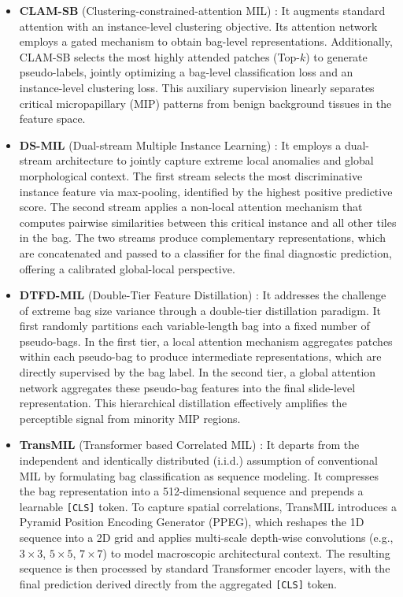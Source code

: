 \documentclass[journal]{IEEEtran}
\theoremstyle{remark}
\providecommand{\citep}[1]{\cite{#1}}
\begin{document}
\begin{itemize}
    \item \textbf{CLAM-SB} (Clustering-constrained-attention MIL) \citep{lu2021data}: It augments standard attention with an instance-level clustering objective. Its attention network employs a gated mechanism to obtain bag-level representations. Additionally, CLAM-SB selects the most highly attended patches (Top-$k$) to generate pseudo-labels, jointly optimizing a bag-level classification loss and an instance-level clustering loss. This auxiliary supervision linearly separates critical micropapillary (MIP) patterns from benign background tissues in the feature space.
    
    \item \textbf{DS-MIL} (Dual-stream Multiple Instance Learning) \citep{li2021dual}: It employs a dual-stream architecture to jointly capture extreme local anomalies and global morphological context. The first stream selects the most discriminative instance feature via max-pooling, identified by the highest positive predictive score. The second stream applies a non-local attention mechanism that computes pairwise similarities between this critical instance and all other tiles in the bag. The two streams produce complementary representations, which are concatenated and passed to a classifier for the final diagnostic prediction, offering a calibrated global-local perspective.
    
    \item \textbf{DTFD-MIL} (Double-Tier Feature Distillation) \citep{zhang2022double}: It addresses the challenge of extreme bag size variance through a double-tier distillation paradigm. It first randomly partitions each variable-length bag into a fixed number of pseudo-bags. In the first tier, a local attention mechanism aggregates patches within each pseudo-bag to produce intermediate representations, which are directly supervised by the bag label. In the second tier, a global attention network aggregates these pseudo-bag features into the final slide-level representation. This hierarchical distillation effectively amplifies the perceptible signal from minority MIP regions.
    
    \item \textbf{TransMIL} (Transformer based Correlated MIL) \citep{lu2021data, shao2021transmil}: It departs from the independent and identically distributed (i.i.d.) assumption of conventional MIL by formulating bag classification as sequence modeling. It compresses the bag representation into a 512-dimensional sequence and prepends a learnable \texttt{[CLS]} token. To capture spatial correlations, TransMIL introduces a Pyramid Position Encoding Generator (PPEG), which reshapes the 1D sequence into a 2D grid and applies multi-scale depth-wise convolutions (e.g., $3 \times 3$, $5 \times 5$, $7 \times 7$) to model macroscopic architectural context. The resulting sequence is then processed by standard Transformer encoder layers, with the final prediction derived directly from the aggregated \texttt{[CLS]} token.
\end{itemize}
\end{document}
